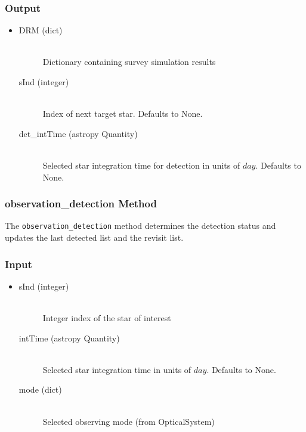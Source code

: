 \documentclass[cleanfoot]{asme2ej}
\begin{document}
\subsubsection*{Output}
\begin{itemize}
\item 
\begin{description}
    \item[DRM (dict)] \hfill \\ Dictionary containing survey simulation results
    \item[sInd (integer)] \hfill \\ Index of next target star. Defaults to None.
    \item[det\_intTime (astropy Quantity)] \hfill \\ Selected star integration time for detection in units of $day$. Defaults to None.
\end{description}
\end{itemize}

\subsubsection{observation\_detection Method} \label{sec:observationdetectiontask}
The \verb+observation_detection+ method determines the detection status and updates the last detected list and the revisit list. 

\subsubsection*{Input}
\begin{itemize}
\item
\begin{description}
    \item[sInd (integer)] \hfill \\ Integer index of the star of interest
    \item[intTime (astropy Quantity)] \hfill \\ Selected star integration time in units of $day$. Defaults to None.
    \item[mode (dict)] \hfill \\ Selected observing mode (from OpticalSystem)
\end{description}
\end{itemize}
\end{document}
